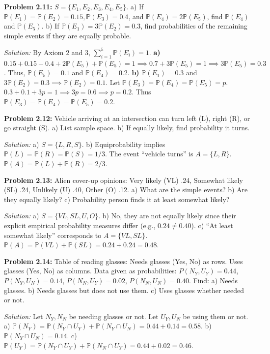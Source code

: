 \documentclass[11pt]{article}
\newcommand{\prob}[1]{\vspace{4mm}\noindent\textbf{Problem #1:}}
\newcommand{\sol}{\vspace{2mm}\noindent\textit{Solution: }}
\begin{document}
\prob{2.11}
$S = \{E_1, E_2, E_3, E_4, E_5\}$. 
a) If $\mathbb{P}(E_1) = \mathbb{P}(E_2) = 0.15, \mathbb{P}(E_3) = 0.4$, and $\mathbb{P}(E_4) = 2\mathbb{P}(E_5)$, find $\mathbb{P}(E_4)$ and $\mathbb{P}(E_5)$.
b) If $\mathbb{P}(E_1) = 3\mathbb{P}(E_2) = 0.3$, find probabilities of the remaining simple events if they are equally probable.

\sol 
By Axiom 2 and 3, $\sum_{i=1}^5 \mathbb{P}(E_i) = 1$.
\textbf{a)} $0.15 + 0.15 + 0.4 + 2\mathbb{P}(E_5) + \mathbb{P}(E_5) = 1 \implies 0.7 + 3\mathbb{P}(E_5) = 1 \implies 3\mathbb{P}(E_5) = 0.3$. 
Thus, $\mathbb{P}(E_5) = 0.1$ and $\mathbb{P}(E_4) = 0.2$.
\textbf{b)} $\mathbb{P}(E_1) = 0.3$ and $3\mathbb{P}(E_2) = 0.3 \implies \mathbb{P}(E_2) = 0.1$.
Let $\mathbb{P}(E_3) = \mathbb{P}(E_4) = \mathbb{P}(E_5) = p$.
$0.3 + 0.1 + 3p = 1 \implies 3p = 0.6 \implies p = 0.2$. 
Thus $\mathbb{P}(E_3) = \mathbb{P}(E_4) = \mathbb{P}(E_5) = 0.2$.

\prob{2.12}
Vehicle arriving at an intersection can turn left (L), right (R), or go straight (S). 
a) List sample space. b) If equally likely, find probability it turns.

\sol 
a) $S = \{L, R, S\}$.
b) Equiprobability implies $\mathbb{P}(L) = \mathbb{P}(R) = \mathbb{P}(S) = 1/3$. The event ``vehicle turns'' is $A = \{L, R\}$. 
$\mathbb{P}(A) = \mathbb{P}(L) + \mathbb{P}(R) = 2/3$.

\prob{2.13}
Alien cover-up opinions: Very likely (VL) .24, Somewhat likely (SL) .24, Unlikely (U) .40, Other (O) .12.
a) What are the simple events? b) Are they equally likely? c) Probability person finds it at least somewhat likely?

\sol 
a) $S = \{VL, SL, U, O\}$.
b) No, they are not equally likely since their explicit empirical probability measures differ (e.g., $0.24 \neq 0.40$).
c) ``At least somewhat likely'' corresponds to $A = \{VL, SL\}$.
$\mathbb{P}(A) = \mathbb{P}(VL) + \mathbb{P}(SL) = 0.24 + 0.24 = 0.48$.

\prob{2.14}
Table of reading glasses: 
Needs glasses (Yes, No) as rows. Uses glasses (Yes, No) as columns.
Data given as probabilities: $P(N_Y, U_Y) = 0.44$, $P(N_Y, U_N) = 0.14$, $P(N_N, U_Y) = 0.02$, $P(N_N, U_N) = 0.40$. Find:
a) Needs glasses. b) Needs glasses but does not use them. c) Uses glasses whether needed or not.

\sol 
Let $N_Y, N_N$ be needing glasses or not. Let $U_Y, U_N$ be using them or not.
a) $\mathbb{P}(N_Y) = \mathbb{P}(N_Y \cap U_Y) + \mathbb{P}(N_Y \cap U_N) = 0.44 + 0.14 = 0.58$.
b) $\mathbb{P}(N_Y \cap U_N) = 0.14$.
c) $\mathbb{P}(U_Y) = \mathbb{P}(N_Y \cap U_Y) + \mathbb{P}(N_N \cap U_Y) = 0.44 + 0.02 = 0.46$.
\end{document}
